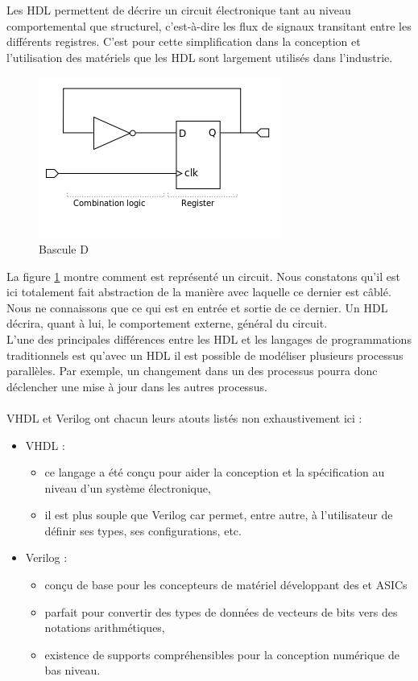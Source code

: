 Les HDL permettent de décrire un circuit électronique tant au niveau comportemental que structurel, c'est-à-dire les flux de signaux transitant entre les différents registres. C'est pour cette simplification dans la conception et l'utilisation des matériels que les HDL sont largement utilisés dans l'industrie.\\
\begin{figure}[h!]
\centering
\includegraphics[scale=0.9]{rtl_example.png}
\caption{Bascule D}
\label{BasculeD}
\end{figure}
La figure \ref{BasculeD} montre comment est représenté un circuit. Nous constatons qu'il est ici totalement fait abstraction de la manière avec laquelle ce dernier est câblé. Nous ne connaissons que ce qui est en entrée et sortie de ce dernier. Un HDL décrira, quant à lui, le {\og}comportement{\fg} externe, général du circuit.\\
L'une des principales différences entre les HDL et les langages de programmations traditionnels est qu'avec un HDL il est possible de modéliser plusieurs processus parallèles. Par exemple, un changement dans un des processus pourra donc déclencher une mise à jour dans les autres processus.\\
\\
VHDL et Verilog ont chacun leurs atouts listés non exhaustivement ici :
\begin{itemize}
\item VHDL :
    \begin{itemize}
    \item ce langage a été conçu pour aider la conception et la spécification au niveau d'un système électronique,
    \item il est plus souple que Verilog car permet, entre autre, à l'utilisateur de définir ses types, ses configurations, etc.
    \end{itemize}
    \vspace{10px}
    \item Verilog :
    \begin{itemize}
    \item conçu de base pour les concepteurs de matériel développant des \fpgas{} et ASICs
    \item parfait pour convertir des types de données de vecteurs de bits vers des notations arithmétiques,
    \item existence de supports compréhensibles pour la conception numérique de bas niveau.
    \end{itemize}
\end{itemize}
